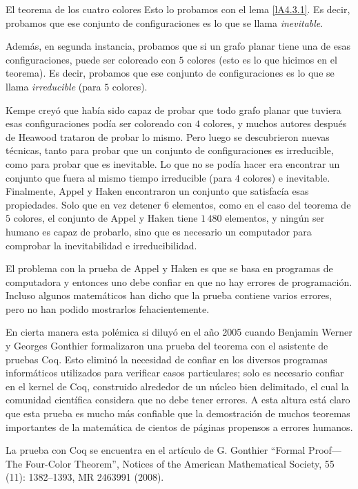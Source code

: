 \begin{section}{El teorema de los cuatro colores}
Esto lo probamos con el lema \ref{lA4.3.1}. Es decir, probamos que ese conjunto de configuraciones es lo que se llama \textit{inevitable}.

Además, en segunda instancia, probamos que si un grafo planar tiene una de esas configuraciones, puede ser coloreado con $5$ colores (esto es lo que hicimos en el teorema). Es decir, probamos que ese conjunto de con\-fi\-gu\-ra\-cio\-nes es lo que se llama \textit{irreducible} (para $5$ colores). 

Kempe creyó que había sido capaz de probar que todo grafo planar que tuviera esas configuraciones podía ser coloreado con $4$ colores, y muchos autores después de Heawood trataron de probar lo mismo. Pero luego se descubrieron nuevas técnicas, tanto para probar que un conjunto de configuraciones es irreducible, como para probar que es inevitable. Lo que no se podía hacer era encontrar un conjunto que fuera al mismo tiempo irre\-du\-ci\-ble (para $4$ colores) e inevitable. Finalmente, Appel y Haken encontraron un conjunto que satisfacía esas propiedades. Solo que en vez detener $6$ elementos, como en el caso del teorema de $5$ colores, el conjunto de Appel y Haken tiene $1\,480$ elementos, y ningún ser humano es capaz de probarlo, sino que es necesario un computador para comprobar la inevitabilidad e irreducibilidad.

El problema con la prueba de  Appel y Haken es que se basa en programas de computadora y entonces uno debe confiar en que no hay errores de programación. Incluso algunos matemáticos han dicho que la prueba contiene varios errores, pero  no han podido mostrarlos fehacientemente. 

En  cierta manera esta polémica si diluyó en el año 2005 cuando Benjamin Werner y Georges Gonthier formalizaron una prueba del teorema con el asistente de pruebas Coq. Esto eliminó la necesidad de confiar en los diversos programas informáticos utilizados para verificar casos particulares; solo es necesario confiar en el kernel de Coq, construido alrededor de un núcleo bien delimitado, el cual la comunidad científica considera que no debe tener errores. A esta altura está claro que esta prueba es mucho más confiable que la demostración de muchos teoremas importantes de la matemática de cientos de páginas propensos a errores humanos.

La prueba con Coq se encuentra en el artículo de G. Gonthier ``Formal Proof—The Four-Color Theorem'', Notices of the American Mathematical Society, 55 (11): 1382–1393, MR 2463991 (2008).  

\end{section}

